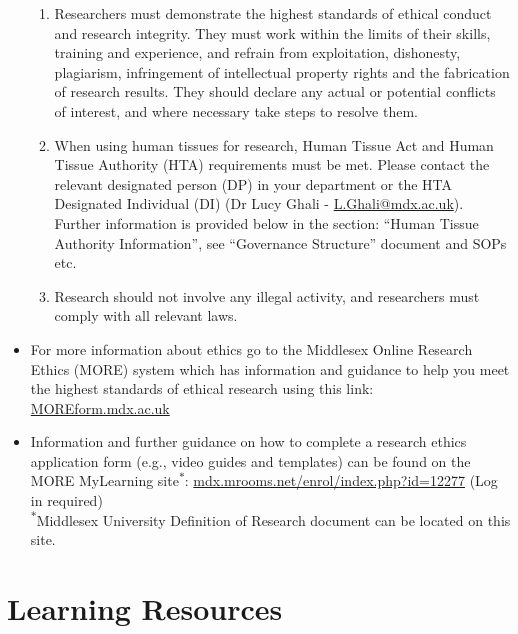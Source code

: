\documentclass{MDXHandbook}
\begin{document}
\begin{itemize}
\begin{enumerate}
			\item Researchers must demonstrate the highest standards of ethical conduct and research integrity. They must work within the limits of their skills, training and experience, and refrain from exploitation, dishonesty, plagiarism, infringement of intellectual property rights and the fabrication of research results. They should declare any actual or potential conflicts of interest, and where necessary take steps to resolve them. 
			\item When using human tissues for research, Human Tissue Act and Human Tissue Authority (HTA) requirements must be met. Please contact the relevant designated person (DP) in your department or the HTA Designated Individual (DI) (Dr Lucy Ghali - \href{mailto:L.Ghali@mdx.ac.uk}{L.Ghali@mdx.ac.uk}). Further information is provided below in the section: ``Human Tissue Authority Information'', see ``Governance Structure'' document and SOPs etc.
			\item Research should not involve any illegal activity, and researchers must comply with all relevant laws.
		\end{enumerate}
	\item For more information about ethics go to the Middlesex Online Research Ethics (MORE) system which has information and guidance to help you meet the highest standards of ethical research using this link: \url{MOREform.mdx.ac.uk}
	\item Information and further guidance on how to complete a research ethics application form (e.g., video guides and templates) can be found on the MORE MyLearning site\textsuperscript{$\ast$}: \url{mdx.mrooms.net/enrol/index.php?id=12277} (Log in required)\\ 
\textsuperscript{$\ast$}Middlesex University Definition of Research document can be located on this site.
\end{itemize}

\section{Learning Resources}

\end{document}
